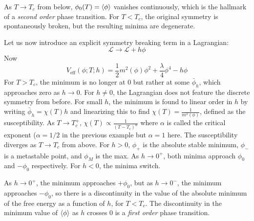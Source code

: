 \documentclass[a4paper,twoside,master.tex]{subfiles}
\begin{document}
As $ T \to T_c $ from below, $ \phi_0(T) = \ev{\phi} $ vanishes continuously, which is the hallmark of a \textit{second order} phase transition. For $ T < T_c $, the original symmetry is spontaneously broken, but the resulting minima are degenerate.

Let us now introduce an explicit symmetry breaking term in a Lagrangian:
\begin{equation}
    \mathcal{L} \to \mathcal{L} + h \phi
\end{equation}
Now
\begin{equation}
    V_{\text{eff}}(\phi ; T ; h) = \frac{1}{2} m^2(\phi) \phi^2 + \frac{\lambda}{4} \phi^4 - h \phi
\end{equation}
For $ T > T_c $, the minimum is no longer at $ 0 $ but rather at some $ \bar{\phi}_h $, which approaches zero as $ h \to 0 $. For $ h \neq 0 $, the Lagrangian does not feature the discrete symmetry from before. For small $ h $, the minimum is found to linear order in $ h $ by writing $ \bar{\phi}_h = \chi(T) h $ and linearizing this to find $ \chi(T) = \frac{1}{m^2(\phi)} $, defined as the susceptibility. As $ T \to T_c^+ $, $ \chi(T) \propto \frac{1}{(T - T_c)^{\alpha}} $ where $ \alpha $ is called the critical exponent ($ \alpha = 1/2 $ in the previous example but $ \alpha = 1 $ here. The susceptibility diverges as $ T \to T_c $ from above. For $ h > 0 $, $ \phi_+ $ is the absolute stable minimum, $ \phi_- $ is a metastable point, and $ \phi_M $ is the max. As $ h \to 0^+ $, both minima approach $ \phi_0 $ and $ - \phi_0 $ respectively. For $ h < 0 $, the minima switch.

As $ h \to 0^+ $, the minimum approaches $ + \phi_0 $, but as $ h \to 0^- $, the minimum approaches $ - \phi_0 $, so there is a discontinuity in the value of the absolute minimum of the free energy as a function of $ h $, for $ T < T_c $. The discontinuity in the minimum value of $ \ev{\phi} $ as $ h $ crosses $ 0 $ is a \textit{first order} phase transition.
\end{document}
